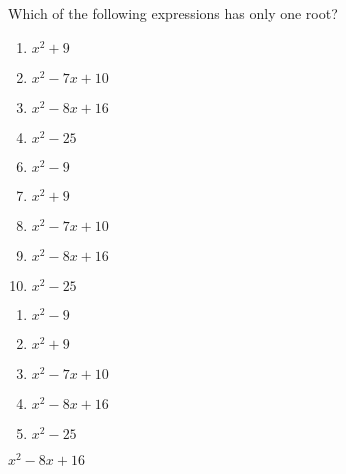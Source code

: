 

  Which of the following expressions has only one root? 


\ifsat
	\begin{enumerate}[label=\Alph*)]
		\item  $x^{2}+9$
		\item  $x^{2}-7x+10$
		\item  $x^2-8x+16$%
		\item  $x^2-25$
	\end{enumerate}
\else
\fi

\ifacteven
	\begin{enumerate}[label=\textbf{\Alph*.},itemsep=\fill,align=left]
		\setcounter{enumii}{5}
		\item   $x^{2}-9$
		\item  $x^{2}+9$
		\item  $x^{2}-7x+10$
		\addtocounter{enumii}{1}
		\item  $x^2-8x+16$%
		\item  $x^2-25$
	\end{enumerate}
\else
\fi

\ifactodd
	\begin{enumerate}[label=\textbf{\Alph*.},itemsep=\fill,align=left]
		\item   $x^{2}-9$
		\item  $x^{2}+9$
		\item  $x^{2}-7x+10$
		\item  $x^2-8x+16$%
		\item  $x^2-25$
	\end{enumerate}
\else
\fi

\ifgridin
  $x^2-8x+16$%
		
\else
\fi

